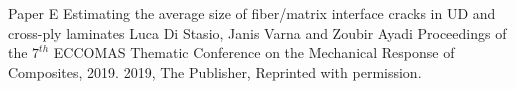 \documentclass[12pt,a4paper,openright,final,twoside]{msethesis}
\begin{document}
\newrefsection
\makepapersubmitted
  {\paperheader}
  {\papertitle}
  {\paperauthorstring}
  {}
  {\copyrightstring}



\def\paperheader{Paper E}
\def\papertitle{Estimating the average size of fiber/matrix interface cracks in UD and cross-ply laminates}
\def\paperauthorstring{Luca Di Stasio, Janis Varna and Zoubir Ayadi}
\def\referencestring{Proceedings of the $7^{th}$ ECCOMAS Thematic Conference on the Mechanical Response of Composites, 2019.}
\def\copyrightstring{2019, The Publisher, Reprinted with permission.}

\newrefsection
\makepaper
  {\paperheader}
  {\papertitle}
  {\paperauthorstring}
  {\referencestring}
  {\copyrightstring}



\end{document}
